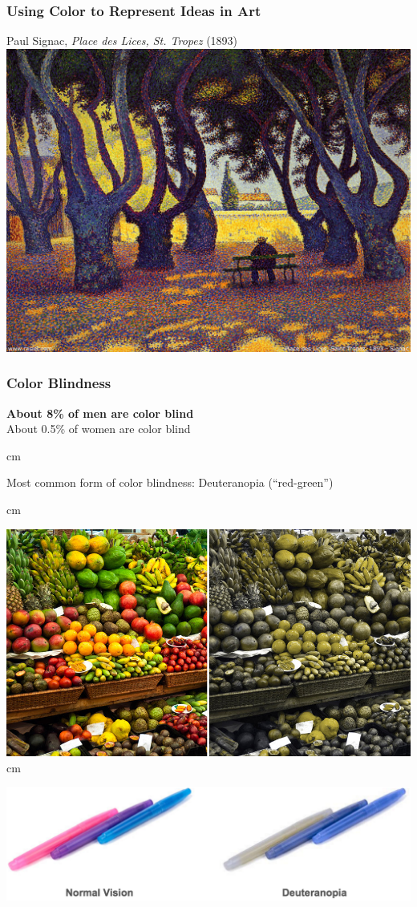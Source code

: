 \documentclass{beamer} %
\begin{document}
\begin{frame}\frametitle{Using Color to Represent Ideas in Art}
	\centering
	
	Paul Signac, \emph{Place des Lices, St. Tropez} (1893)\\
	
	\includegraphics[width=0.95\linewidth]{signac}
	
\end{frame}



\begin{frame}\frametitle{Color Blindness}
	\centering
	
	\textbf{About 8\% of men are color blind}\\
	About 0.5\% of women are color blind
	
	 cm
	
	Most common form of color blindness:  Deuteranopia (``red-green'')
	
	 cm
	
	\includegraphics[width=0.66\linewidth]{redgreen}\\
	
	 cm
	
	\includegraphics[width=0.77\linewidth]{redgreen2}
	
\end{frame}
\end{document}
